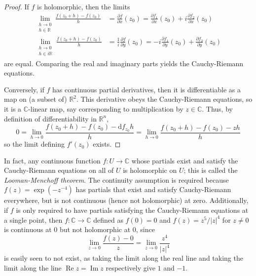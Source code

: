 \documentclass[10pt]{article}
\providecommand{\dd}{\mathrm d}
\providecommand{\CC}{\mathbb C}
\providecommand{\RR}{\mathbb R}
\providecommand{\opname}{\operatorname}
\providecommand{\abs}[1]{\left\lvert{#1}\right\rvert}
\providecommand{\vocab}[1]{{{\sffamily\textit{#1}}}}
\begin{document}
\begin{proof}
    If $f$ is holomorphic, then the limits
    \begin{align*}
	\lim_{\substack{h\to 0\\h\in\RR}} \frac{f(z_0+h) - f(z_0)}h
	&= \frac{\partial f}{\partial x}(z_0)
	= \frac{\partial f_1}{\partial x}(z_0)
	+ i\frac{\partial f_2}{\partial x}(z_0)\\
	\lim_{\substack{h\to 0\\h\in i\RR}} \frac{f(z_0+h) - f(z_0)}{h}
	&= \frac 1i\frac{\partial f}{\partial y}(z_0)
	= -i\frac{\partial f_1}{\partial y}(z_0)
	+ \frac{\partial f_2}{\partial y}(z_0)
    \end{align*}
    are equal. Comparing the real and imaginary parts
    yields the Cauchy-Riemann equations.

    Conversely, if $f$ has continuous partial derivatives,
    then it is differentiable as a map on (a subset of) $\RR^2$.
    This derivative obeys the Cauchy-Riemann equations,
    so it is a $\CC$-linear map, say corresponding to multiplication by
    $z\in\CC$. Thus, by definition of differentiability in $\RR^n$,
    \begin{equation*}
	0 = \lim_{h\to 0}\frac{f(z_0+h) - f(z_0) - \dd f_{z_0}h}h
	= \lim_{h\to 0}\frac{f(z_0+h) - f(z_0) - zh}h
    \end{equation*}
    so the limit defining $f'(z_0)$ exists.
\end{proof}

\begin{remark}
    In fact, any continuous function $f\colon U\to \CC$
    whose partials exist and satisfy the Cauchy-Riemann equations
    on all of $U$ is holomorphic on $U$;
    this is called the \vocab{Looman-Menchoff theorem}.
    The continuity assumption is required because
    $f(z) = \exp(-z^{-4})$ has partials that exist and satisfy
    Cauchy-Riemann everywhere, but is not continuous
    (hence not holomorphic) at zero.
    Additionally, if $f$ is only required to have partials
    satisfying the Cauchy-Riemann equations at a single point,
    then $f\colon\CC\to\CC$ defined as $f(0) = 0$ and
    $f(z) = z^5/\abs{z}^4$ for $z\ne 0$ is continuous at $0$
    but not holomorphic at $0$, since
    \begin{equation*}
	\lim_{z\to 0} \frac{f(z) - 0}{z}
	= \lim_{z\to 0} \frac{z^4}{\abs z^4}
    \end{equation*}
    is easily seen to not exist, as taking the limit along the real line
    and taking the limit along the line $\opname{Re}z = \opname{Im}z$
    respectively give $1$ and $-1$.
\end{remark}
\end{document}
